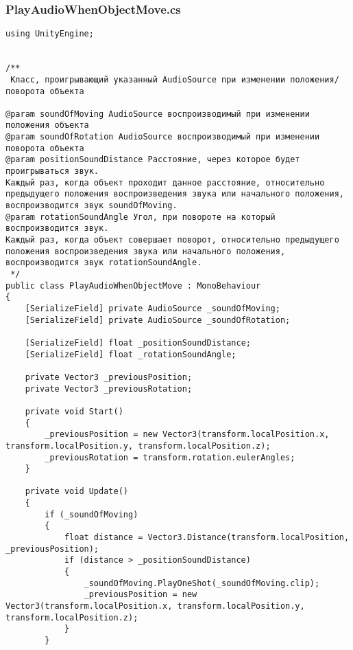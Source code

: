 \subsubsection*{PlayAudioWhenObjectMove.cs}
\begin{verbatim}
﻿using UnityEngine;


/**
 Класс, проигрывающий указанный AudioSource при изменении положения/поворота объекта

@param soundOfMoving AudioSource воспроизводимый при изменении положения объекта
@param soundOfRotation AudioSource воспроизводимый при изменении поворота объекта
@param positionSoundDistance Расстояние, через которое будет проигрываться звук. 
Каждый раз, когда объект проходит данное расстояние, относительно предыдущего положения воспроизведения звука или начального положения, воспроизводится звук soundOfMoving.
@param rotationSoundAngle Угол, при повороте на который воспроизводится звук.
Каждый раз, когда объект совершает поворот, относительно предыдущего положения воспроизведения звука или начального положения, воспроизводится звук rotationSoundAngle.
 */
public class PlayAudioWhenObjectMove : MonoBehaviour
{
    [SerializeField] private AudioSource _soundOfMoving;
    [SerializeField] private AudioSource _soundOfRotation;

    [SerializeField] float _positionSoundDistance;
    [SerializeField] float _rotationSoundAngle;

    private Vector3 _previousPosition;
    private Vector3 _previousRotation;

    private void Start()
    {
        _previousPosition = new Vector3(transform.localPosition.x, transform.localPosition.y, transform.localPosition.z);
        _previousRotation = transform.rotation.eulerAngles;
    }

    private void Update()
    {
        if (_soundOfMoving)
        {
            float distance = Vector3.Distance(transform.localPosition, _previousPosition);
            if (distance > _positionSoundDistance)
            {
                _soundOfMoving.PlayOneShot(_soundOfMoving.clip);
                _previousPosition = new Vector3(transform.localPosition.x, transform.localPosition.y, transform.localPosition.z);
            }
        }


\end{verbatim}
